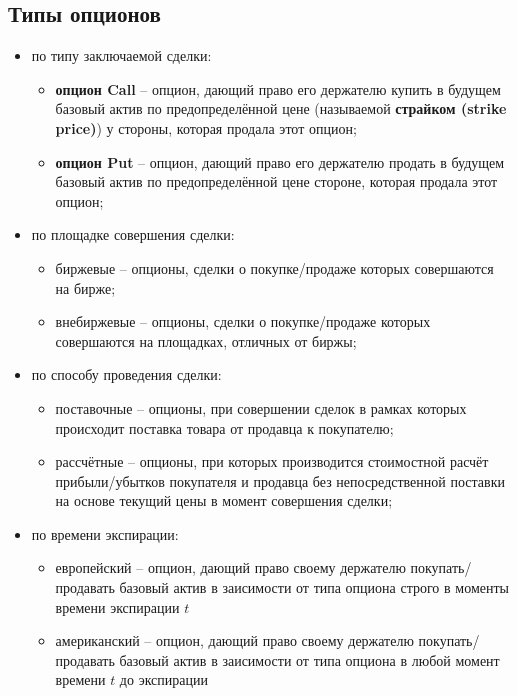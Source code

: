 \documentclass{article}
\begin{document}
\subsection{Типы опционов}
\begin{itemize}
    \item по типу заключаемой сделки:
    \begin{itemize}
        \item \textbf{опцион Call} -- опцион, дающий право его держателю купить в будущем базовый актив по предопределённой цене (называемой \textbf{страйком (strike price)}) у стороны, которая продала этот опцион;
        \item \textbf{опцион Put} -- опцион, дающий право его держателю продать в будущем базовый актив по предопределённой цене стороне, которая продала этот опцион;
    \end{itemize}
    \item по площадке совершения сделки:
    \begin{itemize}
        \item биржевые -- опционы, сделки о покупке/продаже которых совершаются на бирже;
        \item внебиржевые -- опционы, сделки о покупке/продаже которых совершаются на площадках, отличных от биржы;
    \end{itemize}
    \item по способу проведения сделки:
    \begin{itemize}
        \item поставочные -- опционы, при совершении сделок в рамках которых происходит поставка товара от продавца к покупателю;
        \item рассчётные -- опционы, при которых производится стоимостной расчёт прибыли/убытков покупателя и продавца без непосредственной поставки на основе текущий цены в момент совершения сделки;
    \end{itemize}
    \item по времени экспирации:
    \begin{itemize}
        \item европейский -- опцион, дающий право своему держателю покупать/продавать базовый актив в заисимости от типа опциона строго в моменты времени экспирации \(t\)
        \item американский -- опцион, дающий право своему держателю покупать/продавать базовый актив в заисимости от типа опциона в любой момент времени \(t\) до экспирации
    \end{itemize}
\end{itemize}
\end{document}
